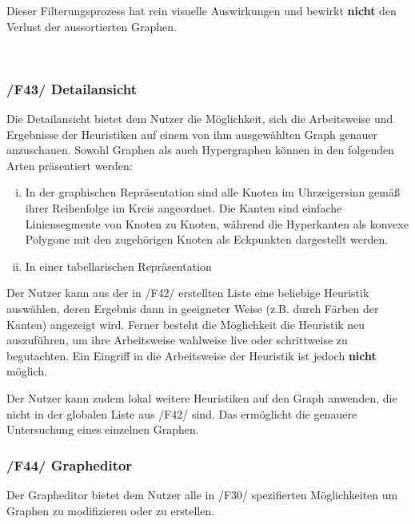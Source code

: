 \documentclass{article}
\begin{document}
	Dieser Filterungsprozess hat rein visuelle Auswirkungen und bewirkt \textbf{nicht} den Verlust der aussortierten Graphen.
	
	~\newpage
	\subsubsection*{/F43/ Detailansicht} \label{f43} 
	
	Die Detailansicht bietet dem Nutzer die Möglichkeit, sich die Arbeitsweise und Ergebnisse der Heuristiken auf einem von ihm ausgewählten Graph genauer anzuschauen. Sowohl Graphen als auch Hypergraphen können in den folgenden Arten präsentiert werden:
	\begin{enumerate}[i)]
		\item{In der graphischen Repräsentation sind alle Knoten im Uhrzeigersinn gemäß ihrer Reihenfolge im Kreis angeordnet. Die Kanten sind einfache Liniensegmente von Knoten zu Knoten, während die Hyperkanten als konvexe Polygone mit den zugehörigen Knoten als Eckpunkten dargestellt werden.}
		\item{In einer tabellarischen Repräsentation}
	\end{enumerate}
	
	Der Nutzer kann aus der in /F42/ erstellten Liste eine beliebige Heuristik auswählen, deren Ergebnis dann in geeigneter Weise (z.B. durch Färben der Kanten) angezeigt wird. Ferner besteht die Möglichkeit die Heuristik neu auszuführen, um ihre Arbeitsweise wahlweise live oder schrittweise zu begutachten. Ein Eingriff in die Arbeitsweise der Heuristik ist jedoch \textbf{nicht} möglich.
	
	Der Nutzer kann zudem lokal weitere Heuristiken auf den Graph anwenden, die nicht in der globalen Liste aus /F42/ sind. Das ermöglicht die genauere Untersuchung eines einzelnen Graphen.
	
	\subsubsection*{/F44/ Grapheditor} \label{f44} 
	Der Grapheditor bietet dem Nutzer alle in /F30/ spezifierten Möglichkeiten um Graphen zu modifizieren oder zu erstellen.
	
	
	~\newpage
\end{document}
